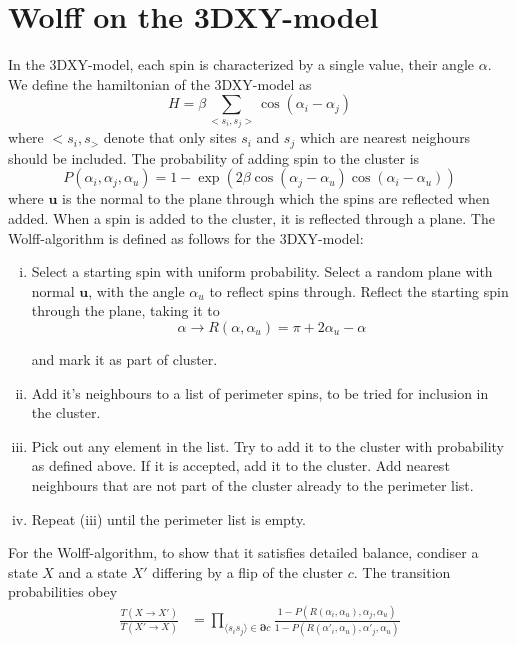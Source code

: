 \section{Wolff on the 3DXY-model}
In the 3DXY-model, each spin is characterized by a single value, their angle $\alpha$.
We define the hamiltonian of the 3DXY-model as 
\begin{equation}
  H = \beta\sum_{<s_i,s_j>} \cos(\alpha_i - \alpha_j)
\end{equation}
where $<s_i,s_>$ denote that only sites $s_i$ and $s_j$ which are nearest neighours should be included.
The probability of adding spin to the cluster is
\begin{equation}
 P(\alpha_i,\alpha_j,\alpha_u) = 1 - \exp(2\beta \cos(\alpha_j - \alpha_u)\cos(\alpha_i - \alpha_u))
  \label{pflip}
\end{equation}
where $\bm{u}$ is the normal to the plane through which the spins are reflected when added.
When a spin is added to the cluster, it is reflected through a plane.
The Wolff-algorithm is defined as follows for the 3DXY-model:
\begin{enumerate}[(i)]
\item Select a starting spin with uniform probability. Select a random plane with normal $\bm{u}$, with the angle $\alpha_u$  to reflect spins through. Reflect the starting spin through the plane, taking it to 
$$\alpha \rightarrow R(\alpha,\alpha_u) = \pi + 2\alpha_u - \alpha$$

and mark it as part of cluster.

\item Add it's neighbours to a list of perimeter spins, to be tried for inclusion in the cluster.

\item Pick out any element in the list. Try to add it to the cluster with probability as defined above. If it is accepted, add it to the cluster. Add nearest neighbours that are not part of the cluster already to the perimeter list.

\item Repeat (iii) until the perimeter list is empty.
\end{enumerate}
For the Wolff-algorithm, to show that it satisfies detailed balance, condiser a 
state $X$ and a state $X'$ differing by a flip of the cluster $c$. 
The transition probabilities obey
\begin{align}
  \frac{T(X\rightarrow X')}{T(X'\rightarrow X)} &= \prod_{\langle s_i s_j \rangle \in \bm{\partial} c} \frac{ 1- P(R(\alpha_i,\alpha_u),\alpha_j,\alpha_u)}{1- P(R(\alpha'_i,\alpha_u),\alpha'_j,\alpha_u)}
\end{align}
